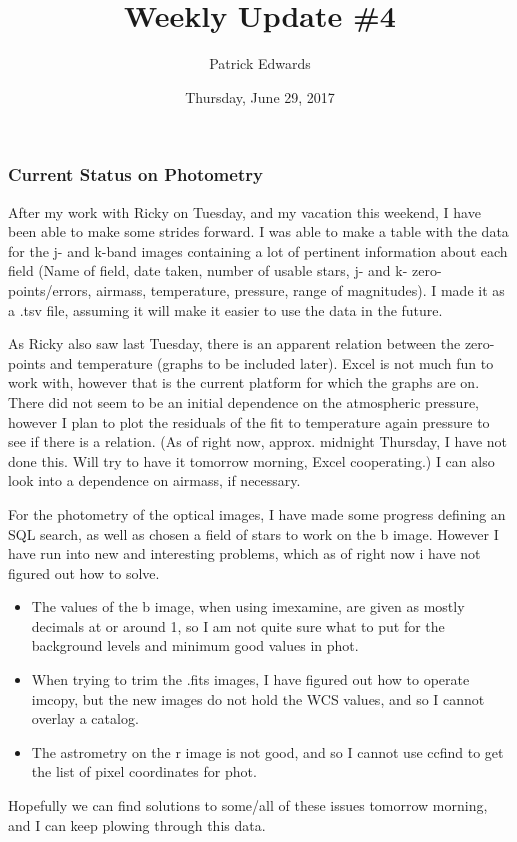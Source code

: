 \documentclass[a4paper]{article}
\title{Weekly Update \#4}
\author{Patrick Edwards}
\begin{document}
\date{Thursday, June 29, 2017}
\maketitle

\subsubsection{Current Status on Photometry}

After my work with Ricky on Tuesday, and my vacation this weekend, I have been able to make some strides forward.  I was able to make a table with the data for the j- and k-band images containing a lot of pertinent information about each field (Name of field, date taken, number of usable stars, j- and k- zero-points/errors, airmass, temperature, pressure, range of magnitudes).  I made it as a .tsv file, assuming it will make it easier to use the data in the future.  \par
As Ricky also saw last Tuesday, there is an apparent relation between the zero-points and temperature (graphs to be included later).  Excel is not much fun to work with, however that is the current platform for which the graphs are on.  There did not seem to be an initial dependence on the atmospheric pressure, however I plan to plot the residuals of the fit to temperature again pressure to see if there is a relation. (As of right now, approx. midnight Thursday, I have not done this.  Will try to have it tomorrow morning, Excel cooperating.)  I can also look into a dependence on airmass, if necessary.  \par
For the photometry of the optical images, I have made some progress defining an SQL search, as well as chosen a field of stars to work on the b image.  However I have run into new and interesting problems, which as of right now i have not figured out how to solve.  
\begin{itemize}
\item The values of the b image, when using imexamine, are given as mostly decimals at or around 1, so I am not quite sure what to put for the background levels and minimum good values in phot.
\item When trying to trim the .fits images, I have figured out how to operate imcopy, but the new images do not hold the WCS values, and so I cannot overlay a catalog.  
\item The astrometry on the r image is not good, and so I cannot use ccfind to get the list of pixel coordinates for phot.  
\end{itemize}
Hopefully we can find solutions to some/all of these issues tomorrow morning, and I can keep plowing through this data.
\end{document}
